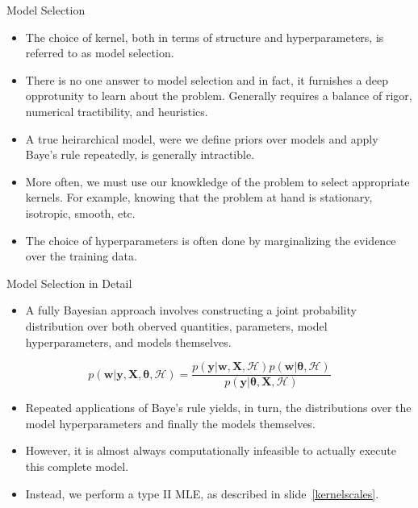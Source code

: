 \documentclass[10pt]{beamer}
\begin{document}
\begin{frame}{Model Selection}
  \begin{itemize}
  \item The choice of kernel, both in terms of structure and hyperparameters, is referred to as model selection. 
  \item There is no one answer to model selection and in fact, it furnishes a deep opprotunity to learn about the problem.
    Generally requires a balance of rigor, numerical tractibility, and heuristics.  
  \item A true heirarchical model, were we define priors over models and apply Baye's rule repeatedly, is generally intractible.
  \item More often, we must use our knowkledge of the problem to select appropriate kernels. For example, knowing that the problem at hand is stationary, isotropic, smooth, etc. 
  \item The choice of hyperparameters is often done by marginalizing the evidence over the training data.
  \end{itemize}
\end{frame}


\begin{frame}{Model Selection in Detail}
  \begin{itemize}
  \item A fully Bayesian approach involves constructing a joint probability distribution over both oberved quantities, parameters, model hyperparameters, and models themselves.
  \end{itemize}
  \begin{equation}
    \label{eq:1}
    p \left( \bm{w} | \bm{y}, \bm{X}, \bm{\theta}, \mathcal{H} \right)
    = \frac{p \left( \bm{y} | \bm{w}, \bm{X}, \mathcal{H} \right) p \left( \bm{w} | \bm{\theta}, \mathcal{H} \right) }
    {p \left( \bm{y} | \bm{\theta},\bm{X}, \mathcal{H} \right) }
  \end{equation}
  \begin{itemize}
  \item Repeated applications of Baye's rule yields, in turn, the distributions over the model hyperparameters and finally the models themselves.
  \item However, it is almost always computationally infeasible to actually execute this complete model. 
  \item Instead, we perform a type II MLE, as described in slide~\ref{kernelscales}.
  \end{itemize}
\end{frame}
\end{document}
